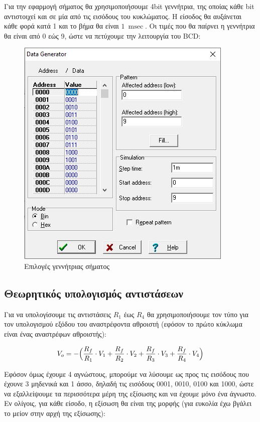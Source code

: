 \documentclass[12pt]{article}
\begin{document}
Για την εφαρμογή σήματος θα χρησιμοποιήσουμε 4bit γεννήτρια, της οποίας κάθε
bit αντιστοιχεί και σε μία από τις εισόδους του κυκλώματος. Η είσοδος θα
αυξάνεται κάθε φορά κατά 1 και το βήμα θα είναι $\SI{1}{\milli\sec}$. Οι τιμές
που θα παίρνει η γεννήτρια θα είναι από 0 εώς 9, ώστε να πετύχουμε την
λειτουργία του BCD:

\begin{figure}[H]
	\centering
	\includegraphics{./res/sig.jpg}
	\caption{Επιλογές γεννήτριας σήματος}
\end{figure}

\subsection{Θεωρητικός υπολογισμός αντιστάσεων}

Για να υπολογίσουμε τις αντιστάσεις $R_1$ έως $R_4$ θα χρησιμοποιήσουμε
τον τύπο για τον υπολογισμού εξόδου του αναστρέφοντα αθροιστή (εφόσον το
πρώτο κύκλωμα είναι ένας αναστρέφων αθροιστής):

\[V_o = - \Big{(}\frac{R_f}{R_1} \cdot V_1 + \frac{R_f}{R_2} \cdot V_2 +
\frac{R_f}{R_3} \cdot V_3 + \frac{R_f}{R_4} \cdot V_4 \Big{)}\]

Εφόσον όμως έχουμε 4 αγνώστους, μπορούμε να λύσουμε ως προς τις εισόδους που
έχουνε 3 μηδενικά και 1 άσσο, δηλαδή τις εισόδους 0001, 0010, 0100 και 1000,
ώστε να εξαλλείψουμε τα περισσότερα μέρη της εξίσωσης και να έχουμε μόνο ένα
άγνωστο. Εν ολίγοις, για κάθε είσοδο, η εξίσωση θα είναι της μορφής (για
ευκολία έχω βγάλει το μείον στην αρχή της εξίσωσης):
\end{document}
